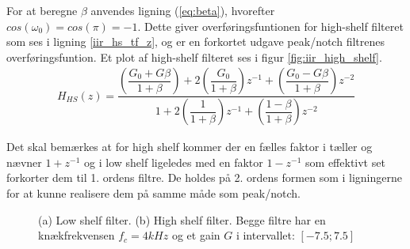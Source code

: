      For at beregne $\beta$ anvendes ligning (\ref{eq:beta}), hvorefter $cos(\omega_0) = cos(\pi) = -1$. Dette giver overføringsfuntionen for high-shelf filteret som ses i ligning \ref{iir_hs_tf_z}, og er en forkortet udgave peak/notch filtrenes overføringsfuntion. Et plot af high-shelf filteret ses i figur \ref{fig:iir_high_shelf}.
     \begin{align}
     H_{HS}(z) = \dfrac{\left(\dfrac{G_0 + G \beta}{1 + \beta} \right)+ 2 \left(\dfrac{G_0 }{1 +\beta} \right)z^{-1} + \left(\dfrac{ G_0 - G \beta}{1 + \beta }\right) z^{-2}}{1 + 2 \left(\dfrac{1}{1 + \beta}\right)z^{-1} + \left( \dfrac{1 - \beta}{1 + \beta} \right) z^{-2}}\label{iir_hs_tf_z}
     \end{align}

     Det skal bemærkes at for high shelf kommer der en fælles faktor i tæller og nævner $1 + z^{-1}$ og i low shelf ligeledes med en faktor $1 - z^{-1}$  
     som effektivt set forkorter dem til 1. ordens filtre. De holdes på 2. ordens formen som i ligningerne for at kunne realisere dem på samme måde som peak/notch.


\begin{figure}[h]
	\centering
	\caption{(a) Low shelf filter. (b) High shelf filter. \newline Begge filtre har en knækfrekvensen $f_c = 4kHz$ og et gain $G$ i intervallet: $[-7.5 ; 7.5]$}
\end{figure}
\FloatBlock



